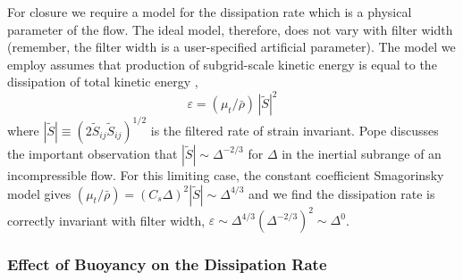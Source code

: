For closure we require a model for the dissipation rate which is a physical parameter of the flow.  The ideal model, therefore, does not vary with filter width (remember, the filter width is a user-specified artificial parameter).  The model we employ assumes that production of subgrid-scale kinetic energy is equal to the dissipation of total kinetic energy \cite{Pope:2000},
\begin{equation}
\label{eqn_dissipation}
\varepsilon = (\mu_t/\bar{\rho}) \, |\tilde{S}|^2 %
\end{equation}
where $|\tilde{S}| \equiv (2 \tilde{S}_{ij} \tilde{S}_{ij})^{1/2}$ is the filtered rate of strain invariant.  Pope \cite{Pope:2000} discusses the important observation that $|\tilde{S}|\sim \Delta^{-2/3}$ for $\Delta$ in the inertial subrange of an incompressible flow.  For this limiting case, the constant coefficient Smagorinsky model gives $(\mu_t/\bar{\rho}) = (C_s \Delta)^2 |\tilde{S}| \sim \Delta^{4/3}$ and we find the dissipation rate is correctly invariant with filter width, $\varepsilon \sim \Delta^{4/3} (\Delta^{-2/3})^2 \sim \Delta^0$.

\subsubsection{Effect of Buoyancy on the Dissipation Rate}

